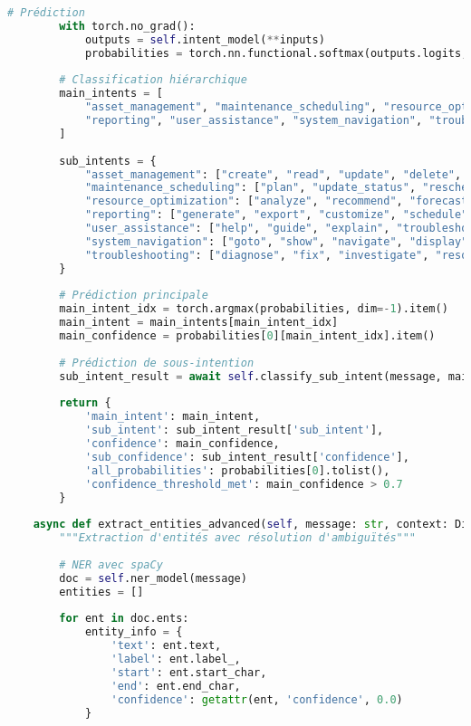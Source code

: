 \documentclass[12pt,a4paper]{report}
\begin{document}
\begin{lstlisting}[language=Python, caption=Pipeline NLP avancé pour le chatbot]
        # Prédiction
        with torch.no_grad():
            outputs = self.intent_model(**inputs)
            probabilities = torch.nn.functional.softmax(outputs.logits, dim=-1)
        
        # Classification hiérarchique
        main_intents = [
            "asset_management", "maintenance_scheduling", "resource_optimization",
            "reporting", "user_assistance", "system_navigation", "troubleshooting"
        ]
        
        sub_intents = {
            "asset_management": ["create", "read", "update", "delete", "search", "assign"],
            "maintenance_scheduling": ["plan", "update_status", "reschedule", "cancel"],
            "resource_optimization": ["analyze", "recommend", "forecast", "allocate"],
            "reporting": ["generate", "export", "customize", "schedule"],
            "user_assistance": ["help", "guide", "explain", "troubleshoot"],
            "system_navigation": ["goto", "show", "navigate", "display"],
            "troubleshooting": ["diagnose", "fix", "investigate", "resolve"]
        }
        
        # Prédiction principale
        main_intent_idx = torch.argmax(probabilities, dim=-1).item()
        main_intent = main_intents[main_intent_idx]
        main_confidence = probabilities[0][main_intent_idx].item()
        
        # Prédiction de sous-intention
        sub_intent_result = await self.classify_sub_intent(message, main_intent, sub_intents)
        
        return {
            'main_intent': main_intent,
            'sub_intent': sub_intent_result['sub_intent'],
            'confidence': main_confidence,
            'sub_confidence': sub_intent_result['confidence'],
            'all_probabilities': probabilities[0].tolist(),
            'confidence_threshold_met': main_confidence > 0.7
        }
    
    async def extract_entities_advanced(self, message: str, context: Dict) -> Dict:
        """Extraction d'entités avec résolution d'ambiguïtés"""
        
        # NER avec spaCy
        doc = self.ner_model(message)
        entities = []
        
        for ent in doc.ents:
            entity_info = {
                'text': ent.text,
                'label': ent.label_,
                'start': ent.start_char,
                'end': ent.end_char,
                'confidence': getattr(ent, 'confidence', 0.0)
            }
            

\end{lstlisting}
\end{document}

